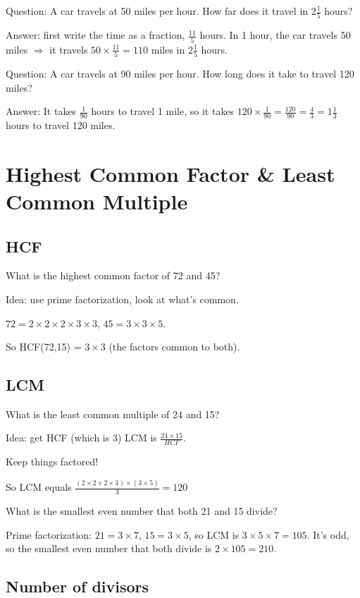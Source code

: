 \documentclass[fullpage,twocolumn]{article}
\newcommand{\vp}{{\vspace{0.1in}}}
\begin{document}
Question: A car travels at 50 miles per hour. How far does it
travel in $2\frac{1}{5}$ hours?

\vp
Answer: first write the time as a fraction, $\frac{11}{5}$ hours.
In 1 hour, the car travels 50 miles $\Rightarrow$ it travels $50 \times \frac{11}{5} = 110$ miles in
$2\frac{1}{5}$ hours.

Question: A car travels at 90 miles per hour. How long does it take to travel 120 miles?

\vp
Answer: It takes $\frac{1}{90}$ hours to travel 1 mile, so it takes $120\times \frac{1}{90} = \frac{120}{90} = \frac{4}{3} = 1 \frac{1}{3}$ hours to travel 120 miles.

\section{
Highest Common Factor \& Least Common Multiple
}


\subsection{HCF}
What is the highest common factor of 72 and 45?

Idea: use prime factorization, look at what's common.

$72 = 2 \times 2 \times 2 \times 3 \times 3 $, $45 = 3 \times 3 \times 5$.

So HCF(72,15) = $ 3 \times 3 $ (the factors common to both).

\subsection{LCM}

What is the least common multiple of 24 and 15?

Idea:  get HCF (which is 3)
LCM is $\frac{24 \times 15}{HCF}$.

Keep things factored!

So LCM equals 
$\frac{(2 \times 2 \times 2 \times 3) \times (3 \times 5)}{ 3} = 120$

What is the smallest even number that both 21 and 15 divide?

Prime factorization: $21 = 3 \times 7$, $15 = 3 \times 5$, so LCM is 
$3 \times 5 \times 7 = 105$. It's odd, so the smallest even number
that both divide is $2 \times 105 = 210$.

\subsection{Number of divisors}
\end{document}
